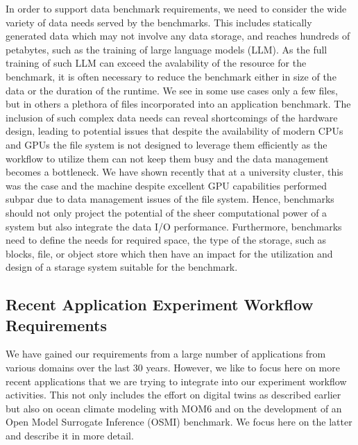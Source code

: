 \documentclass[utf8]{FrontiersinVancouver} %
\newcommand{\TODO}[1]{\todo[inline]{#1}}
\begin{document}
In order to support data benchmark requirements, we need to consider the wide variety of data needs served by the benchmarks. This includes statically generated data which may not involve any data storage, and reaches hundreds of petabytes, such as  the training of large language models (LLM). As the full training of such LLM can exceed the avalability of the resource for the benchmark, it is often necessary to reduce the benchmark either in size of the data or the duration of the runtime. 
We see in some use cases only a few files, but in others a plethora of files incorporated into an application benchmark. The inclusion of such complex data needs can reveal shortcomings of the hardware design, leading to potential issues that despite the availability of modern CPUs and GPUs the file system is not designed to leverage them efficiently as the workflow to utilize them can not keep them busy and the data management becomes a bottleneck. We have shown recently that at a university cluster, this was the case and the machine despite excellent GPU capabilities performed subpar due to data management issues of the file system. Hence, benchmarks should not only project the potential of the sheer computational power of a system but also integrate the data I/O performance. Furthermore, benchmarks need to define the needs for required space, the type of the storage, such as blocks, file, or object store which then have an impact for the utilization and design of a starage system suitable for the benchmark.


\subsection{Recent Application Experiment Workflow Requirements}
\label{sec:application}

We have gained our requirements from a large number of applications from various domains over the last 30 years. However, we like to focus here on more recent applications that we are trying to integrate into our experiment workflow activities. This not only includes the effort on digital twins as described earlier but also on ocean climate modeling with MOM6 and on the development of an Open Model Surrogate Inference (OSMI) benchmark. We focus here on the latter and describe it in more detail.
\end{document}

